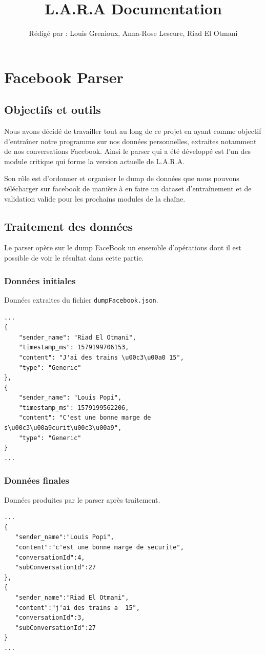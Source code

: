 \documentclass[10pt,a4paper]{article}
\title{L.A.R.A Documentation}
\author{Rédigé par : Louis Grenioux, Anna-Rose Lescure, Riad El Otmani}
\begin{document}
\maketitle
\tableofcontents

\section{Facebook Parser}
\subsection{Objectifs et outils}
Nous avons décidé de travailler tout au long de ce projet en ayant comme objectif d'entraîner notre programme sur nos données personnelles, extraites notamment de nos conversations Facebook. Ainsi le parser qui a été développé est l'un des module critique qui forme la version actuelle de L.A.R.A.

Son rôle est d'ordonner et organiser le dump de données que nous pouvons télécharger sur facebook de manière à en faire un dataset d'entraînement et de validation valide pour les prochains modules de la chaîne.
\subsection{Traitement des données}
Le parser opère sur le dump FaceBook un ensemble d'opérations dont il est possible de voir le résultat dans cette partie.
\subsubsection{Données initiales}
Données extraites du fichier \texttt{dumpFacebook.json}.
\begin{verbatim}
...
{
    "sender_name": "Riad El Otmani",
    "timestamp_ms": 1579199706153,
    "content": "J'ai des trains \u00c3\u00a0 15",
    "type": "Generic"
},
{
    "sender_name": "Louis Popi",
    "timestamp_ms": 1579199562206,
    "content": "C'est une bonne marge de s\u00c3\u00a9curit\u00c3\u00a9",
    "type": "Generic"
}
...
\end{verbatim}

\subsubsection{Données finales}
Données produites par le parser après traitement.
\begin{verbatim}
...
{
   "sender_name":"Louis Popi",
   "content":"c'est une bonne marge de securite",
   "conversationId":4,
   "subConversationId":27
},
{
   "sender_name":"Riad El Otmani",
   "content":"j'ai des trains a  15",
   "conversationId":3,
   "subConversationId":27
}
...
\end{verbatim}
\end{document}

